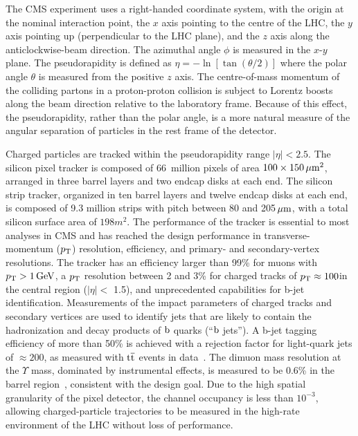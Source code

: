 \documentclass[12pt,twoside,a4paper,cmspaper,final,collab]{cms-tdr}
\begin{document}
The CMS experiment uses a right-handed coordinate system, with the origin at the nominal interaction point,
the $x$ axis pointing to the centre of the LHC, the $y$ axis pointing up (perpendicular to the LHC
plane), and the $z$ axis along the anticlockwise-beam direction.
The azimuthal angle $\phi$ is measured in the $x$-$y$ plane.
The pseudorapidity is defined as $\eta = -\ln[\tan{(\theta/2)}]$
where the polar angle $\theta$ is
measured from the positive $z$ axis.
The centre-of-mass momentum of the colliding partons in a proton-proton collision is subject to Lorentz boosts along the beam direction
relative to the laboratory frame.
Because of this effect, the pseudorapidity, rather than the polar angle, is a
more natural measure of the angular separation of particles in the rest
frame of the detector.

Charged particles are tracked within the pseudorapidity range
$|\eta|<2.5$.
The silicon pixel tracker is composed of 66~million pixels of area
$100\times150\,\mu\text{m}^2$, arranged in three barrel
layers and two endcap disks at each end. The silicon strip tracker, organized in ten barrel
layers and twelve endcap disks at each end, is composed of 9.3 million strips with pitch between 80 and
205$\,\mu\text{m}$, with a total silicon surface area of $198\unit{m}^2$. The performance of the tracker is essential to most
analyses in CMS and has reached the design performance in
transverse-momentum ($p_{\mathrm{T}}$) resolution, efficiency,
and primary- and secondary-vertex resolutions.
The tracker has an efficiency larger than 99\% for muons with
$p_{\mathrm{T}} >1\,\text{Ge\hspace{-.08em}V}$, a $p_{\mathrm{T}}$ resolution
between 2 and 3\% for charged tracks of $p_{\mathrm{T}} \approx 100$\GeV in the
central region ($|\eta| <$ 1.5),
and unprecedented capabilities for b-jet identification.
Measurements of the impact parameters of charged tracks and secondary vertices are used to
identify jets that are likely to contain the hadronization and decay
products of $\mathrm{b}$ quarks (``$\mathrm{b}$ jets'').
A b-jet tagging efficiency of more than 50\% is achieved with a
rejection factor for light-quark jets of ${\approx}200$, as measured with $\mathrm{t}\overline{\mathrm{t}}$ events in data~\cite{CMS-PAS-BTV-12-001}.
The dimuon mass resolution at the $\Upsilon$ mass, dominated by
instrumental effects, is measured to be 0.6\% in the barrel region~\cite{PhysRevD.83.112004}, consistent with the design
goal.
Due to the high spatial granularity of the pixel detector, the channel occupancy is less than $10^{-3}$,
allowing charged-particle trajectories to be measured
in the high-rate environment of the LHC without loss of performance.
\end{document}
